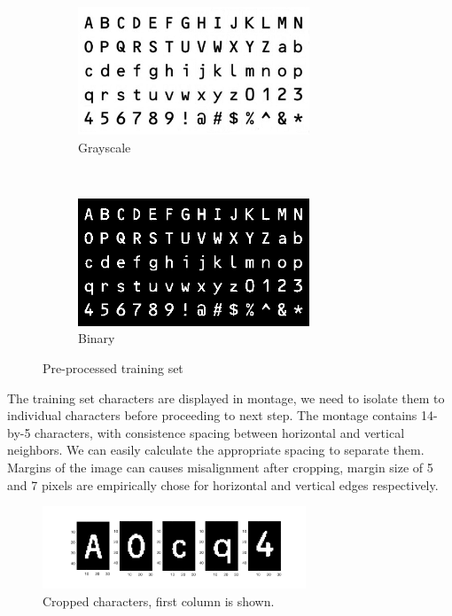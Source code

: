 \documentclass[12pt]{article}
\begin{document}
\begin{figure}[H]
    \centering
    \begin{subfigure}[t]{0.5\textwidth}
        \centering
        \includegraphics[height=1.5in]{images/training_original}
        \caption{Grayscale}
    \end{subfigure}%
    ~
    \begin{subfigure}[t]{0.5\textwidth}
        \centering
        \includegraphics[height=1.5in]{images/training_binary}
        \caption{Binary}
    \end{subfigure}
    \caption{Pre-processed training set}
\end{figure}

The training set characters are displayed in montage, we need to isolate them to individual characters before proceeding to next step. The montage contains 14-by-5 characters, with consistence spacing between horizontal and vertical neighbors. We can easily calculate the appropriate spacing to separate them.
Margins of the image can causes misalignment after cropping, margin size of 5 and 7 pixels are empirically chose for horizontal and vertical edges respectively.

\begin{figure}[H]
    \centering
    \includegraphics[width=0.7\textwidth]{images/training_cropped_col1}
    \caption{Cropped characters, first column is shown.}
\end{figure}
\end{document}
